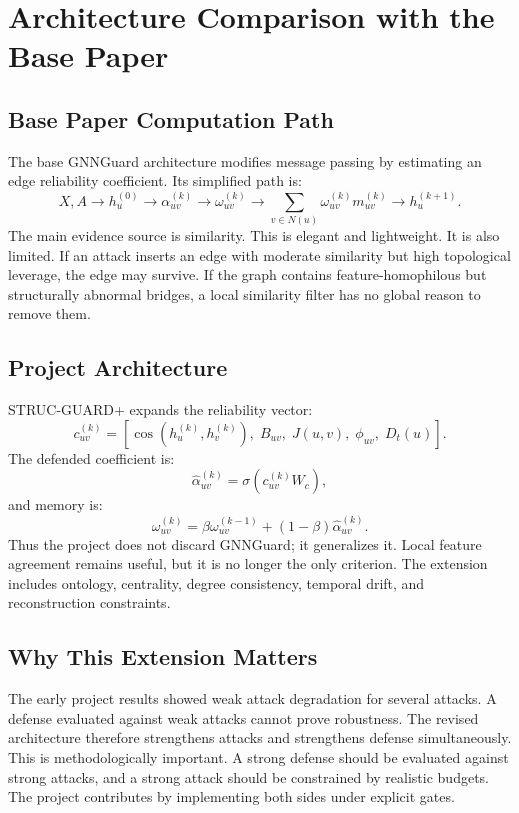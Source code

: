 \documentclass[12pt,oneside]{report}
\begin{document}
\chapter{Architecture Comparison with the Base Paper}

\section{Base Paper Computation Path}
The base GNNGuard architecture modifies message passing by estimating an edge reliability coefficient. Its simplified path is:
$$
X,A \rightarrow h_u^{(0)} \rightarrow \alpha_{uv}^{(k)}
\rightarrow \omega_{uv}^{(k)} \rightarrow
\sum_{v\in N(u)}\omega_{uv}^{(k)}m_{uv}^{(k)}
\rightarrow h_u^{(k+1)}.
$$
The main evidence source is similarity. This is elegant and lightweight. It is also limited. If an attack inserts an edge with moderate similarity but high topological leverage, the edge may survive. If the graph contains feature-homophilous but structurally abnormal bridges, a local similarity filter has no global reason to remove them.

\section{Project Architecture}
STRUC-GUARD+ expands the reliability vector:
$$
c_{uv}^{(k)}=
[\cos(h_u^{(k)},h_v^{(k)}),\;B_{uv},\;J(u,v),\;\phi_{uv},\;D_t(u)].
$$
The defended coefficient is:
$$
\hat{\alpha}_{uv}^{(k)}=\sigma(c_{uv}^{(k)}W_c),
$$
and memory is:
$$
\omega_{uv}^{(k)}=\beta\omega_{uv}^{(k-1)}+(1-\beta)\hat{\alpha}_{uv}^{(k)}.
$$
Thus the project does not discard GNNGuard; it generalizes it. Local feature agreement remains useful, but it is no longer the only criterion. The extension includes ontology, centrality, degree consistency, temporal drift, and reconstruction constraints.

\section{Why This Extension Matters}
The early project results showed weak attack degradation for several attacks. A defense evaluated against weak attacks cannot prove robustness. The revised architecture therefore strengthens attacks and strengthens defense simultaneously. This is methodologically important. A strong defense should be evaluated against strong attacks, and a strong attack should be constrained by realistic budgets. The project contributes by implementing both sides under explicit gates.
\end{document}
